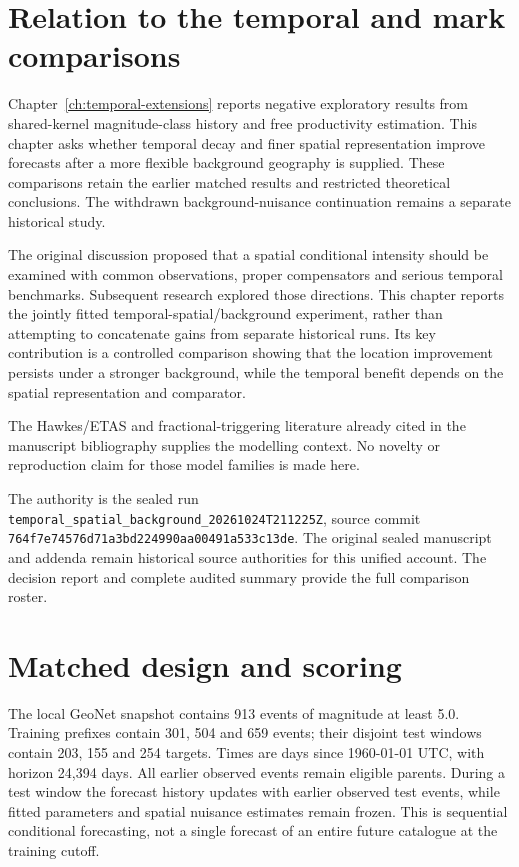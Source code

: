 \section{Relation to the temporal and mark comparisons}

Chapter~\ref{ch:temporal-extensions} reports negative exploratory results from shared-kernel magnitude-class history and free productivity estimation. This chapter asks whether temporal decay and finer spatial representation improve forecasts after a more flexible background geography is supplied. These comparisons retain the earlier matched results and restricted theoretical conclusions. The withdrawn background-nuisance continuation remains a separate historical study.

The original discussion proposed that a spatial conditional intensity should be examined with common observations, proper compensators and serious temporal benchmarks. Subsequent research explored those directions. This chapter reports the jointly fitted temporal-spatial/background experiment, rather than attempting to concatenate gains from separate historical runs. Its key contribution is a controlled comparison showing that the location improvement persists under a stronger background, while the temporal benefit depends on the spatial representation and comparator.

The Hawkes/ETAS and fractional-triggering literature already cited in the manuscript bibliography supplies the modelling context. No novelty or reproduction claim for those model families is made here.

The authority is the sealed run \nolinkurl{temporal_spatial_background_20261024T211225Z}, source commit \nolinkurl{764f7e74576d71a3bd224990aa00491a533c13de}. The original sealed manuscript and addenda remain historical source authorities for this unified account. The decision report and complete audited summary provide the full comparison roster.

\section{Matched design and scoring}

The local GeoNet snapshot contains 913 events of magnitude at least 5.0. Training prefixes contain 301, 504 and 659 events; their disjoint test windows contain 203, 155 and 254 targets. Times are days since 1960-01-01 UTC, with horizon 24,394 days. All earlier observed events remain eligible parents. During a test window the forecast history updates with earlier observed test events, while fitted parameters and spatial nuisance estimates remain frozen. This is sequential conditional forecasting, not a single forecast of an entire future catalogue at the training cutoff.

